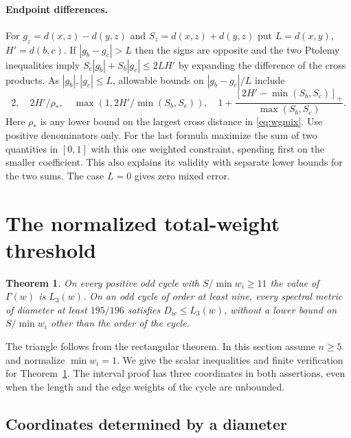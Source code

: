 \documentclass[11pt,a4paper]{article}
\newtheorem{theorem}{Theorem}[section]
\theoremstyle{definition}
\begin{document}
\paragraph{Endpoint differences.}
For $g_z=d(x,z)-d(y,z)$ and $S_z=d(x,z)+d(y,z)$ put $L=d(x,y)$,
$H'=d(b,c)$. If $|g_b-g_c|>L$ then the signs are opposite and the
two Ptolemy inequalities imply
$S_c|g_b|+S_b|g_c|\le2LH'$ by expanding the difference of the cross
products. As $|g_b|,|g_c|\le L$, allowable bounds on
$|g_b-g_c|/L$ include
\begin{equation}
 2,\quad 2H'/\rho_*,\quad
 \max(1,2H'/\min(S_b,S_c)),\quad
 1+\frac{[2H'-\min(S_b,S_c)]_+}{\max(S_b,S_c)} .
 \label{eq:wgendpoint}
\end{equation}
Here $\rho_*$ is any lower bound on the largest cross distance in
\eqref{eq:wgmix}. Use positive denominators only. For the last formula
maximize the sum of two quantities in $[0,1]$ with this one weighted
constraint, spending first on the smaller coefficient. This also
explains its validity with separate lower bounds for the two sums.
The case $L=0$ gives zero mixed error.

\section{The normalized total-weight threshold}\label{sec:threshold}

\begin{theorem}\label{thm:wglong}
On every positive odd cycle with $S/\min w_i\ge11$ the value of
$\Gamma(w)$ is $L_3(w)$. On an odd cycle of order at least nine,
every spectral metric of diameter at least $195/196$ satisfies
$D_w\le L_3(w)$, without a lower bound on $S/\min w_i$ other than
the order of the cycle.
\end{theorem}

The triangle follows from the rectangular theorem. In this section
assume $n\ge5$ and normalize $\min w_i=1$. We give the scalar
inequalities and finite verification for Theorem~\ref{thm:wglong}.
The interval proof has three coordinates in both assertions, even
when the length and the edge weights of the cycle are unbounded.

\subsection{Coordinates determined by a diameter}
\end{document}

